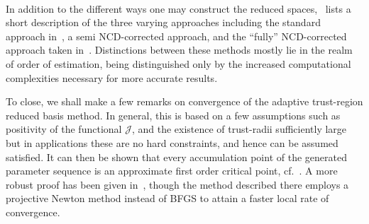 ~\\

In addition to the different ways one may construct the reduced spaces,~\cite[Subsection 4.4]{Keil2021} lists a short description of the three varying approaches including the standard approach in~\cite{Qian2017}, a semi NCD-corrected approach, and the ``fully'' NCD-corrected approach taken in~\cite{Keil2021}.
Distinctions between these methods mostly lie in the realm of order of estimation, being distinguished only by the increased computational complexities necessary for more accurate results.

To close, we shall make a few remarks on convergence of the adaptive trust-region reduced basis method.
In general, this is based on a few assumptions such as positivity of the functional $\mathcal{J}$, and the existence of trust-radii sufficiently large but in applications these are no hard constraints, and hence can be assumed satisfied.
It can then be shown that every accumulation point of the generated parameter sequence is an approximate first order critical point, cf.~\cite[Theorem 4.5]{Keil2021}.
A more robust proof has been given in~\cite{Banholzer2020}, though the method described there employs a projective Newton method instead of BFGS to attain a faster local rate of convergence.